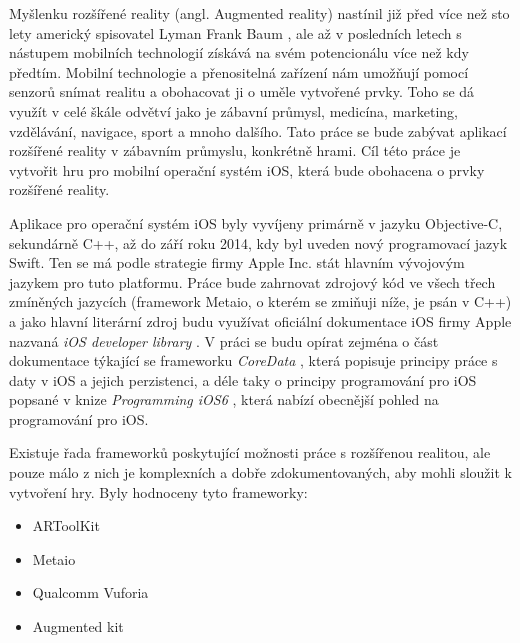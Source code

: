 \documentclass[oneside,12pt]{article}
\begin{document}
\def\,{\penalty10000\hskip.25em}
\pagestyle{headings}
\bakalarska
{}

\obsah

\newpage
%
%
% 
Myšlenku rozšířené reality (angl. Augmented reality) nastínil již před více než sto lety americký spisovatel Lyman Frank Baum \cite{baum}, ale až v posledních letech s nástupem mobilních technologií získává na svém potencionálu více než kdy předtím. Mobilní technologie a přenositelná zařízení nám umožňují pomocí senzorů snímat realitu a obohacovat ji o uměle vytvořené prvky. Toho se dá využít v celé škále odvětví jako je zábavní průmysl, medicína, marketing, vzdělávání, navigace, sport a mnoho dalšího. Tato práce se bude zabývat aplikací rozšířené reality v zábavním průmyslu, konkrétně hrami. Cíl této práce je vytvořit hru pro mobilní operační systém iOS, která bude obohacena o prvky rozšířené reality.


Aplikace pro operační systém iOS byly vyvíjeny primárně v jazyku Objective-C, sekundárně C++, až do září roku 2014, kdy byl uveden nový programovací jazyk Swift. Ten se má podle strategie firmy Apple Inc. stát hlavním vývojovým jazykem pro tuto platformu. Práce bude zahrnovat zdrojový kód ve všech třech zmíněných jazycích (framework Metaio, o kterém se zmiňuji níže, je psán v C++) a jako hlavní literární zdroj budu využívat oficiální dokumentace iOS firmy Apple nazvaná \textit{iOS developer library} \cite{apple_library}. V práci se budu opírat zejména o část dokumentace týkající se frameworku \textit{CoreData} \cite{core_data}, která popisuje principy práce s daty v iOS a jejich perzistenci, a déle taky o principy programování pro iOS popsané v knize \textit{Programming iOS6} \cite{neuburg}, která nabízí obecnější pohled na programování pro iOS.

Existuje řada frameworků poskytující možnosti práce s rozšířenou realitou, ale pouze málo z nich je komplexních a dobře zdokumentovaných, aby mohli sloužit k vytvoření hry. Byly hodnoceny tyto frameworky:
\begin{itemize}
\item 
ARToolKit
\item
Metaio
\item
Qualcomm Vuforia
\item
Augmented kit
\end{itemize}
\end{document}
